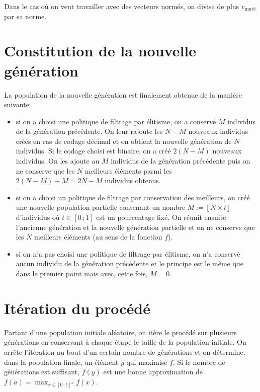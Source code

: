 Dans le cas où on veut travailler avec des vecteurs normés, on divise de plus $v_{\text{muté}}$ par sa norme. 

\section{Constitution de la nouvelle génération}

La population de la nouvelle génération est finalement obtenue de la manière suivante:
\begin{itemize}
	\item si on a choisi une politique de filtrage par élitisme, on a conservé $M$ individus de la génération précédente. On leur rajoute les $N-M$ nouveaux individus créés en cas de codage décimal et on obtient la nouvelle génération de $N$ individus. Si le codage choisi est binaire, on a créé $2(N-M)$ nouveaux individus. On les ajoute au $M$ individus de la génération précédente puis on ne conserve que les $N$ meilleurs éléments parmi les $2(N-M)+M=2N-M$ individus obtenus.
	\item si on a choisi un politique de filtrage par conservation des meilleurs, on créé une nouvelle population partielle contenant un nombre $M := \left\lfloor N\times t\right\rfloor$ d'individus où $t\in [0\,; 1]$ est un pourcentage fixé. On réunit ensuite l'ancienne génération et la nouvelle génération partielle et on ne conserve que les $N$ meilleurs éléments (au sens de la fonction $f$).
	\item si on n'a pas choisi une politique de filtrage par élitisme, on n'a conservé aucun individu de la génération précédente et le principe est le même que dans le premier point mais avec, cette fois, $M=0$.
\end{itemize}

\section{Itération du procédé}

Partant d'une population initiale aléatoire, on itère le procédé sur plusieurs générations en conservant à chaque étape le taille de la population initiale. On arrête l'itération au bout d'un certain nombre de générations et on détermine, dans la population finale, un élément $y$ qui maximise $f$. Si le nombre de générations est suffisant, $f(y)$ est une bonne approximation de $f(a)=\mathop{\max}_{x\in[0\,;1]^n} f(x)$. 








